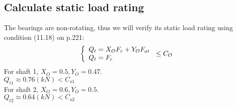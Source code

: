 \subsection{Calculate static load rating}
The bearings are non-rotating, thus we will verify its static load rating using condition (11.18) on p.221:
\[\left\{\begin{array}{l@{{}={}}l}
Q_t & X_OF_r+Y_OF_{at}\\
Q_t & F_r
\end{array}\right. \leq C_O\]
For shaft 1, $ X_O=0.5, Y_O=0.47$.\\
$ Q_{t1}  \approx 0.76 \unit{(kN)} < C_{o1}$\\
For shaft 2, $X_O =0.6,Y_O=0.5  $.\\
$ Q_{t2}  \approx 0.64 \unit{(kN)} < C_{o2}$